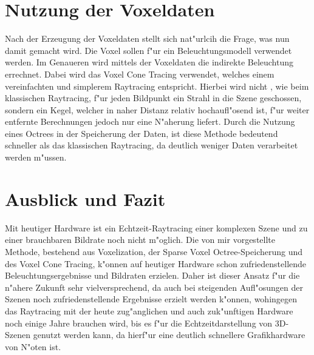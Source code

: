 \documentclass[a4paper, 12pt]{scrartcl}
\begin{document}
\section{Nutzung der Voxeldaten}
Nach der Erzeugung der Voxeldaten stellt sich nat"urlcih die Frage, was nun damit gemacht wird. 
Die Voxel sollen f"ur ein Beleuchtungsmodell verwendet werden. Im Genaueren wird mittels der Voxeldaten die indirekte Beleuchtung errechnet.
Dabei wird das Voxel Cone Tracing verwendet, welches einem vereinfachten und simplerem Raytracing entspricht.
Hierbei wird nicht , wie beim klassischen Raytracing, f"ur jeden Bildpunkt ein Strahl in die Szene geschossen, sondern ein Kegel, welcher in naher Distanz relativ hochaufl"osend ist, f"ur weiter entfernte Berechnungen jedoch nur eine N"aherung liefert. Durch die Nutzung eines Octrees in der Speicherung der Daten, ist diese Methode bedeutend schneller als das klassischen Raytracing, da deutlich weniger Daten verarbeitet werden m"ussen. 

\section{Ausblick und Fazit}
Mit heutiger Hardware ist ein Echtzeit-Raytracing einer komplexen Szene und zu einer brauchbaren Bildrate noch nicht m"oglich. Die von mir vorgestellte Methode, bestehend aus Voxelization, der Sparse Voxel Octree-Speicherung und des Voxel Cone Tracing, k"onnen auf heutiger Hardware schon zufriedenstellende Beleuchtungsergebnisse und Bildraten erzielen. 
Daher ist dieser Ansatz f"ur die n"ahere Zukunft sehr vielversprechend, da auch bei steigenden Aufl"osungen der Szenen noch zufriedenstellende Ergebnisse erzielt werden k"onnen, wohingegen das Raytracing mit der heute zug"anglichen und auch zuk"unftigen Hardware noch einige Jahre brauchen wird, bis es f"ur die Echtzeitdarstellung von 3D-Szenen genutzt werden kann, da hierf"ur eine deutlich schnellere Grafikhardware von N"oten ist.
\end{document}
